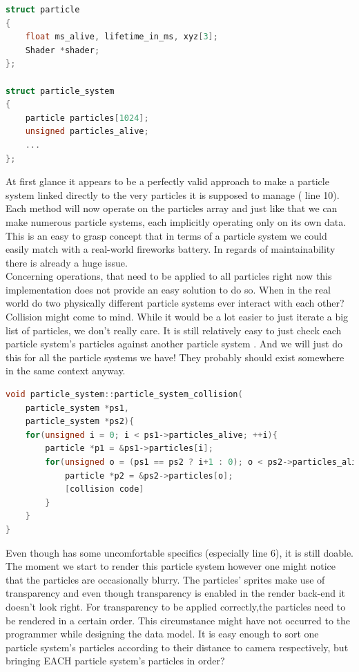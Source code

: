  \begin{lstlisting}[language=C++,name={ OOP typical, simplified particle system implementation.},label={particle_system}]
struct particle
{
	float ms_alive, lifetime_in_ms, xyz[3];
	Shader *shader;
};

struct particle_system
{
	particle particles[1024];
	unsigned particles_alive;
	...
};
\end{lstlisting}
At first glance it appears to be a perfectly valid approach to make a particle system linked directly to the very particles it is supposed to manage ( line 10). Each method will now operate on the particles array and just like that we can make numerous particle systems, each implicitly operating only on its own data. This is an easy to grasp concept that in terms of a particle system we could easily match with a real-world fireworks battery. In regards of maintainability there is already a huge issue.\\
Concerning operations, that need to be applied to all particles right now this implementation does not provide an easy solution to do so. When in the real world do two physically different particle systems ever interact with each other? Collision might come to mind. While it would be a lot easier to just iterate a big list of particles, we don't really care. It is still relatively easy to just check each particle system's particles against another particle system . And we will just do this for all the particle systems we have! They probably should exist somewhere in the same context anyway.\\
 \begin{lstlisting}[language=C++,name={Example code how OOP could handle collision between different particle systems' particles.},label={collision}]
void particle_system::particle_system_collision(
	particle_system *ps1,
	particle_system *ps2){
	for(unsigned i = 0; i < ps1->particles_alive; ++i){
		particle *p1 = &ps1->particles[i];
		for(unsigned o = (ps1 == ps2 ? i+1 : 0); o < ps2->particles_alive; ++o){
			particle *p2 = &ps2->particles[o];
			[collision code]
		}
	}
}
\end{lstlisting}
Even though  has some uncomfortable specifics (especially line 6), it is still doable. The moment we start to render this particle system however one might notice that the particles are occasionally blurry. The particles' sprites make use of transparency and even though transparency is enabled in the render back-end it doesn't look right. For transparency to be applied correctly,the particles need to be rendered in a certain order. This circumstance might have not occurred to the programmer while designing the data model. It is easy enough to sort one particle system's particles according to their distance to camera respectively, but bringing EACH particle system's particles in order?\\
